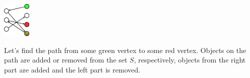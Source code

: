 \begin{center}
  \includegraphics[width=0.10\textwidth, center]{content/various/matroid-intersection.jpg}
\end{center}

Let’s find the path from some green vertex to some red vertex. 
Objects on the path are added or removed from the set $S$, respectively, objects from the right part are added and the left part is removed.
